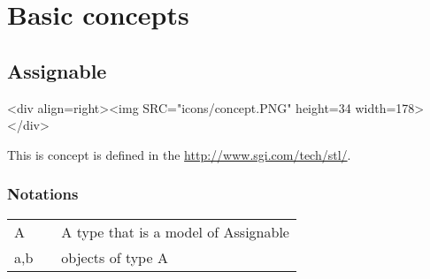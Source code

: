 \documentclass[12pt,twoside]{report}
\begin{document}
\section{Basic concepts}
% 

\subsection{Assignable}
\label{concept:assignable}
\begin{htmlonly}
<div align=right><img SRC="icons/concept.PNG" height=34 width=178></div>
\end{htmlonly}

This is concept is defined in the \hyperref{STL}{STL (see M. Austern, Generic Programming and the STL, Addison Wesley Longman, 1999) }{}{http://www.sgi.com/tech/stl/}.


\subsubsection*{Notations}

\begin{tabular}[!h]{l l l}
A & & A type that is a model of Assignable\\
a,b & & objects of type A\\
\end{tabular}


\htmlrule[CLEAR=all]
 
\end{document}
